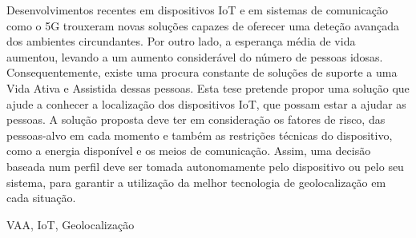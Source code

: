 


Desenvolvimentos recentes em dispositivos IoT e em sistemas de comunicação como o 5G trouxeram novas soluções capazes de oferecer uma deteção avançada dos ambientes circundantes. Por outro lado, a esperança média de vida aumentou, levando a um aumento considerável do número de pessoas idosas. Consequentemente, existe uma procura constante de soluções de suporte a uma Vida Ativa e Assistida dessas pessoas. Esta tese pretende propor uma solução que ajude a conhecer a localização dos dispositivos IoT, que possam estar a ajudar as pessoas. A solução proposta deve ter em consideração os fatores de risco, das pessoas-alvo em cada momento e também as restrições técnicas do dispositivo, como a energia disponível e os meios de comunicação. Assim, uma decisão baseada num perfil deve ser tomada autonomamente pelo dispositivo ou pelo seu sistema, para garantir a utilização da melhor tecnologia de geolocalização em cada situação.





\begin{keywords}
VAA, IoT, Geolocalização
\end{keywords}
